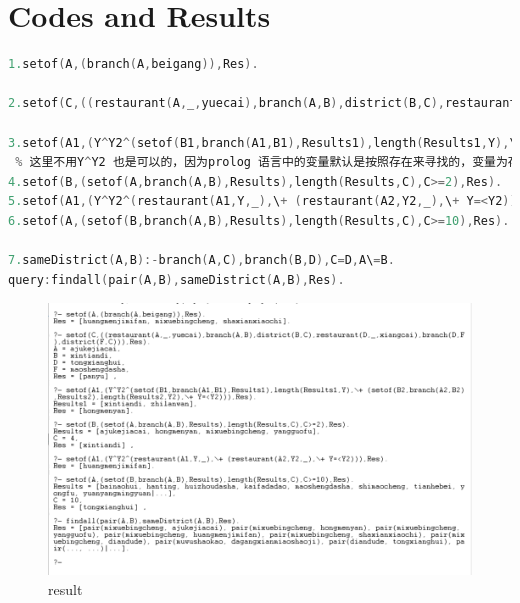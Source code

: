 ﻿\documentclass[a4paper, 11pt]{article}
\begin{document}
\section{Codes and Results}
\begin{lstlisting}[language=C]
1.setof(A,(branch(A,beigang)),Res).

2.setof(C,((restaurant(A,_,yuecai),branch(A,B),district(B,C),restaurant(D,_,xiangcai),branch(D,F),district(F,C))),Res).

3.setof(A1,(Y^Y2^(setof(B1,branch(A1,B1),Results1),length(Results1,Y),\+ (setof(B2,branch(A2,B2),Results2),length(Results2,Y2),\+ Y=<Y2))),Res).
 % 这里不用Y^Y2 也是可以的，因为prolog 语言中的变量默认是按照存在来寻找的，变量为存在量词，同理5 也是如此
4.setof(B,(setof(A,branch(A,B),Results),length(Results,C),C>=2),Res).
5.setof(A1,(Y^Y2^(restaurant(A1,Y,_),\+ (restaurant(A2,Y2,_),\+ Y=<Y2))),Res).
6.setof(A,(setof(B,branch(A,B),Results),length(Results,C),C>=10),Res).

7.sameDistrict(A,B):-branch(A,C),branch(B,D),C=D,A\=B.
query:findall(pair(A,B),sameDistrict(A,B),Res).
\end{lstlisting}

\begin{figure}[ht]
\centering
\includegraphics[width=17.3cm]{pic/1_1.png}
\caption{result}
\end{figure}


%
%
\end{document}
